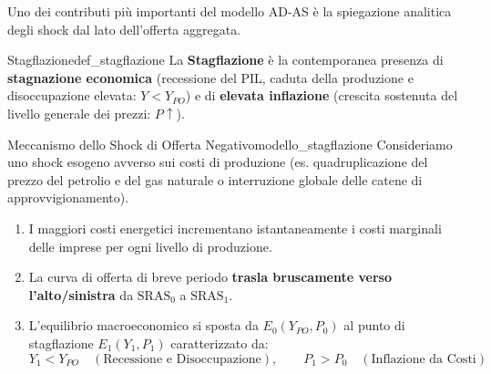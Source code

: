 Uno dei contributi più importanti del modello AD-AS è la spiegazione analitica degli shock dal lato dell'offerta aggregata.

\begin{definizione}{Stagflazione}{def_stagflazione}
La \textbf{Stagflazione} è la contemporanea presenza di \textbf{stagnazione economica} (recessione del PIL, caduta della produzione e disoccupazione elevata: $Y < Y_{PO}$) e di \textbf{elevata inflazione} (crescita sostenuta del livello generale dei prezzi: $P \uparrow$).
\end{definizione}

\begin{modello}{Meccanismo dello Shock di Offerta Negativo}{modello_stagflazione}
Consideriamo uno shock esogeno avverso sui costi di produzione (es. quadruplicazione del prezzo del petrolio e del gas naturale o interruzione globale delle catene di approvvigionamento).
\begin{enumerate}
    \item I maggiori costi energetici incrementano istantaneamente i costi marginali delle imprese per ogni livello di produzione.
    \item La curva di offerta di breve periodo \textbf{trasla bruscamente verso l'alto/sinistra} da $\mathrm{SRAS}_0$ a $\mathrm{SRAS}_1$.
    \item L'equilibrio macroeconomico si sposta da $E_0(Y_{PO}, P_0)$ al punto di stagflazione $E_1(Y_1, P_1)$ caratterizzato da:
    \begin{equation}
        Y_1 < Y_{PO} \quad (\text{Recessione e Disoccupazione}), \qquad P_1 > P_0 \quad (\text{Inflazione da Costi})
    \end{equation}
\end{enumerate}
\end{modello}

